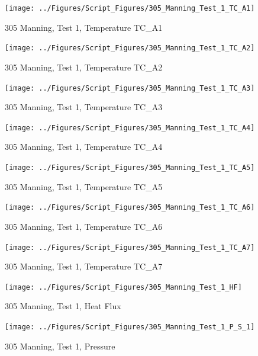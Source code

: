 \documentclass[12pt,oneside]{book}
\begin{document}
\begin{figure}[!ht]
\texttt{[image: ../Figures/Script\_Figures/305\_Manning\_Test\_1\_TC\_A1]}
\caption{305 Manning, Test 1, Temperature TC\_A1}
\label{fig:305_Manning_Test_1_TC_A1}
\end{figure}

\begin{figure}[!ht]
\texttt{[image: ../Figures/Script\_Figures/305\_Manning\_Test\_1\_TC\_A2]}
\caption{305 Manning, Test 1, Temperature TC\_A2}
\label{fig:305_Manning_Test_1_TC_A2}
\end{figure}

\begin{figure}[!ht]
\texttt{[image: ../Figures/Script\_Figures/305\_Manning\_Test\_1\_TC\_A3]}
\caption{305 Manning, Test 1, Temperature TC\_A3}
\label{fig:305_Manning_Test_1_TC_A3}
\end{figure}

\begin{figure}[!ht]
\texttt{[image: ../Figures/Script\_Figures/305\_Manning\_Test\_1\_TC\_A4]}
\caption{305 Manning, Test 1, Temperature TC\_A4}
\label{fig:305_Manning_Test_1_TC_A4}
\end{figure}

\begin{figure}[!ht]
\texttt{[image: ../Figures/Script\_Figures/305\_Manning\_Test\_1\_TC\_A5]}
\caption{305 Manning, Test 1, Temperature TC\_A5}
\label{fig:305_Manning_Test_1_TC_A5}
\end{figure}

\begin{figure}[!ht]
\texttt{[image: ../Figures/Script\_Figures/305\_Manning\_Test\_1\_TC\_A6]}
\caption{305 Manning, Test 1, Temperature TC\_A6}
\label{fig:305_Manning_Test_1_TC_A6}
\end{figure}

\begin{figure}[!ht]
\texttt{[image: ../Figures/Script\_Figures/305\_Manning\_Test\_1\_TC\_A7]}
\caption{305 Manning, Test 1, Temperature TC\_A7}
\label{fig:305_Manning_Test_1_TC_A7}
\end{figure}

\begin{figure}[!ht]
\texttt{[image: ../Figures/Script\_Figures/305\_Manning\_Test\_1\_HF]}
\caption{305 Manning, Test 1, Heat Flux}
\label{fig:305_Manning_Test_1_HF}
\end{figure}

\begin{figure}[!ht]
\texttt{[image: ../Figures/Script\_Figures/305\_Manning\_Test\_1\_P\_S\_1]}
\caption{305 Manning, Test 1, Pressure}
\label{fig:305_Manning_Test_1_P_S_1}
\end{figure}
\end{document}
